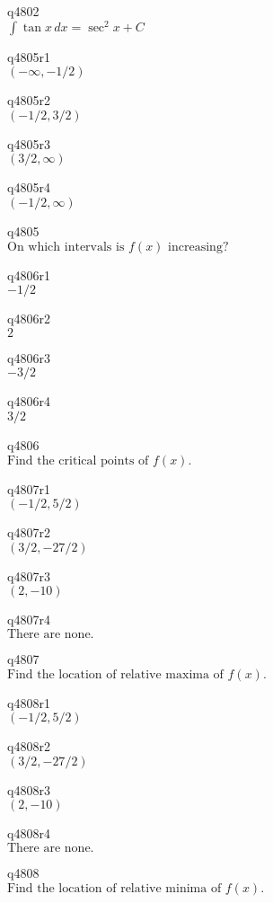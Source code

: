 q4802\\
\(\displaystyle \int \tan x\,dx = \sec^2 x + C \)

q4805r1\\
\(\displaystyle (-\infty, -1/2) \)

q4805r2\\
\(\displaystyle (-1/2, 3/2) \)

q4805r3\\
\(\displaystyle (3/2, \infty) \)

q4805r4\\
\(\displaystyle (-1/2, \infty) \)

q4805\\
\(\displaystyle \text{On which intervals is } f(x) \text{ increasing?} \)

q4806r1\\
\(\displaystyle -1/2 \)

q4806r2\\
\(\displaystyle 2 \)

q4806r3\\
\(\displaystyle -3/2 \)

q4806r4\\
\(\displaystyle 3/2 \)

q4806\\
\(\displaystyle \text{Find the critical points of } f(x). \)

q4807r1\\
\(\displaystyle (-1/2, 5/2) \)

q4807r2\\
\(\displaystyle (3/2, -27/2) \)

q4807r3\\
\(\displaystyle (2, -10) \)

q4807r4\\
\(\displaystyle \text{There are none.} \)

q4807\\
\(\displaystyle \text{Find the location of relative maxima of } f(x). \)

q4808r1\\
\(\displaystyle (-1/2, 5/2) \)

q4808r2\\
\(\displaystyle (3/2, -27/2) \)

q4808r3\\
\(\displaystyle (2, -10) \)

q4808r4\\
\(\displaystyle \text{There are none.} \)

q4808\\
\(\displaystyle \text{Find the location of relative minima of } f(x). \)

